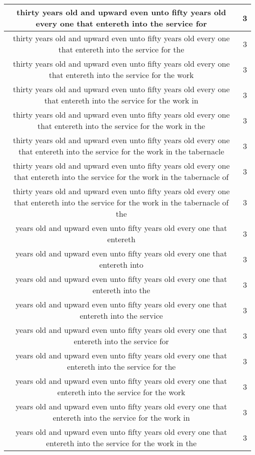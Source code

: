 \begin{center}
\begin{longtable}{|c|c|}
thirty years old and upward even unto fifty years old every one that entereth into the service for & 3\\ \hline 
thirty years old and upward even unto fifty years old every one that entereth into the service for the & 3\\ \hline 
thirty years old and upward even unto fifty years old every one that entereth into the service for the work & 3\\ \hline 
thirty years old and upward even unto fifty years old every one that entereth into the service for the work in & 3\\ \hline 
thirty years old and upward even unto fifty years old every one that entereth into the service for the work in the & 3\\ \hline 
thirty years old and upward even unto fifty years old every one that entereth into the service for the work in the tabernacle & 3\\ \hline 
thirty years old and upward even unto fifty years old every one that entereth into the service for the work in the tabernacle of & 3\\ \hline 
thirty years old and upward even unto fifty years old every one that entereth into the service for the work in the tabernacle of the & 3\\ \hline 
years old and upward even unto fifty years old every one that entereth & 3\\ \hline 
years old and upward even unto fifty years old every one that entereth into & 3\\ \hline 
years old and upward even unto fifty years old every one that entereth into the & 3\\ \hline 
years old and upward even unto fifty years old every one that entereth into the service & 3\\ \hline 
years old and upward even unto fifty years old every one that entereth into the service for & 3\\ \hline 
years old and upward even unto fifty years old every one that entereth into the service for the & 3\\ \hline 
years old and upward even unto fifty years old every one that entereth into the service for the work & 3\\ \hline 
years old and upward even unto fifty years old every one that entereth into the service for the work in & 3\\ \hline 
years old and upward even unto fifty years old every one that entereth into the service for the work in the & 3\\ \hline 

\end{longtable}
\end{center}
